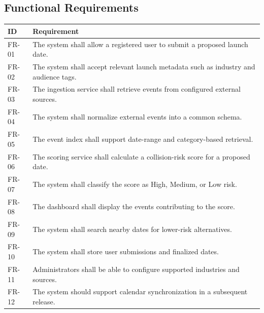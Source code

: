 \documentclass[12pt]{article}
\begin{document}
\subsection{Functional Requirements}
\begin{longtable}{p{}p{}}
\toprule
\textbf{ID} & \textbf{Requirement}\\
\midrule
FR-01 & The system shall allow a registered user to submit a proposed launch date.\\
FR-02 & The system shall accept relevant launch metadata such as industry and audience tags.\\
FR-03 & The ingestion service shall retrieve events from configured external sources.\\
FR-04 & The system shall normalize external events into a common schema.\\
FR-05 & The event index shall support date-range and category-based retrieval.\\
FR-06 & The scoring service shall calculate a collision-risk score for a proposed date.\\
FR-07 & The system shall classify the score as High, Medium, or Low risk.\\
FR-08 & The dashboard shall display the events contributing to the score.\\
FR-09 & The system shall search nearby dates for lower-risk alternatives.\\
FR-10 & The system shall store user submissions and finalized dates.\\
FR-11 & Administrators shall be able to configure supported industries and sources.\\
FR-12 & The system should support calendar synchronization in a subsequent release.\\
\bottomrule
\end{longtable}
\end{document}
